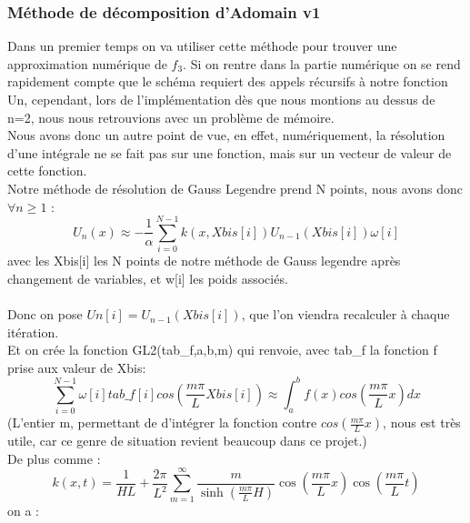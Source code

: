 \documentclass{article}
\begin{document}
\subsubsection{Méthode de décomposition d'Adomain v1}
Dans un premier temps on va utiliser cette méthode pour trouver une approximation numérique de $f_3$. Si on rentre dans la partie numérique on se rend rapidement compte que le schéma requiert des appels récursifs à notre fonction Un, cependant, lors de l'implémentation dès que nous montions au dessus de n=2, nous nous retrouvions avec un problème de mémoire. \\
Nous avons donc un autre point de vue, en effet, numériquement, la résolution d'une intégrale ne se fait pas sur une fonction, mais sur un vecteur de valeur de cette fonction. \\
Notre méthode de résolution de Gauss Legendre prend N points, nous avons donc $\forall n\geq 1$ :
$$U_n(x)\approx-\frac{1}{\alpha}\displaystyle\sum_{i=0}^{N-1} k\left(x,Xbis[i]\right)U_{n-1}\left(Xbis[i]\right)\omega[i]$$
avec les Xbis[i] les N points de notre méthode de Gauss legendre après changement de variables, et w[i] les poids associés.\\
\\
Donc on pose $Un[i]=U_{n-1}\left(Xbis[i]\right)$, que l'on viendra recalculer à chaque itération.\\
Et on crée la fonction GL2(tab\_f,a,b,m) qui renvoie, avec tab\_f la fonction f prise aux valeur de Xbis:
$$\displaystyle\sum_{i=0}^{N-1} \omega[i]tab\_f[i]cos(\frac{m\pi}{L}Xbis[i])\approx \displaystyle\int_a^bf(x)cos(\frac{m\pi}{L}x)dx$$
(L'entier m, permettant de d'intégrer la fonction contre $cos(\frac{m\pi}{L}x)$, nous est très utile, car ce genre de situation revient beaucoup dans ce projet.)
\\
De plus comme :
$$k(x,t)=\frac{1}{HL} +\frac{2\pi}{L^{2}}\sum_{m=1}^{\infty}\frac{m }{\sinh(\frac{m\pi}{L}H)}\cos(\frac{m\pi}{L}x)\cos(\frac{m\pi }{L}t) $$
on a :
\end{document}
